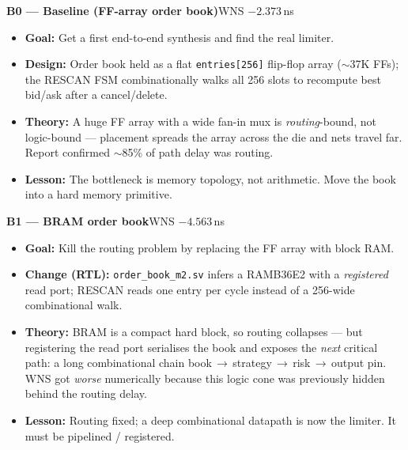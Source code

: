 \documentclass[10pt,a4paper]{article}
\begin{document}
\medskip
{\bfseries\color{accentteal} B0 — Baseline (FF-array order book)}\quad WNS $-2.373$\,ns
\begin{itemize}[leftmargin=1.2em, itemsep=1pt, topsep=2pt]
  \item \textbf{Goal:} Get a first end-to-end synthesis and find the real limiter.
  \item \textbf{Design:} Order book held as a flat \texttt{entries[256]} flip-flop
        array ($\sim$37K FFs); the RESCAN FSM combinationally walks all 256 slots
        to recompute best bid/ask after a cancel/delete.
  \item \textbf{Theory:} A huge FF array with a wide fan-in mux is
        \emph{routing}-bound, not logic-bound — placement spreads the array
        across the die and nets travel far. Report confirmed $\sim$85\% of path
        delay was routing.
  \item \textbf{Lesson:} The bottleneck is memory topology, not arithmetic. Move
        the book into a hard memory primitive.
\end{itemize}

{\bfseries\color{accentteal} B1 — BRAM order book}\quad WNS $-4.563$\,ns
\begin{itemize}[leftmargin=1.2em, itemsep=1pt, topsep=2pt]
  \item \textbf{Goal:} Kill the routing problem by replacing the FF array with
        block RAM.
  \item \textbf{Change (RTL):} \texttt{order\_book\_m2.sv} infers a RAMB36E2 with
        a \emph{registered} read port; RESCAN reads one entry per cycle instead
        of a 256-wide combinational walk.
  \item \textbf{Theory:} BRAM is a compact hard block, so routing collapses — but
        registering the read port serialises the book and exposes the
        \emph{next} critical path: a long combinational chain
        book\,$\to$\,strategy\,$\to$\,risk\,$\to$\,output pin. WNS got
        \emph{worse} numerically because this logic cone was previously hidden
        behind the routing delay.
  \item \textbf{Lesson:} Routing fixed; a deep combinational datapath is now the
        limiter. It must be pipelined / registered.
\end{itemize}
\end{document}
